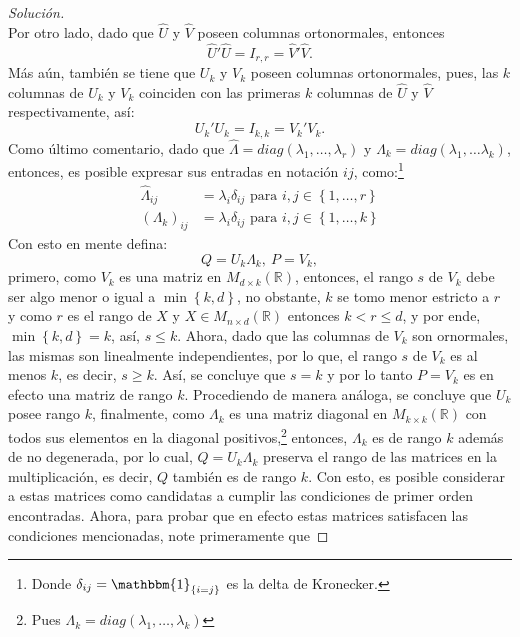 \documentclass[10.5pt,notitlepage]{article}
\newenvironment{solucion}
  {\begin{proof}[Solución]}
  {\end{proof}}
\newcommand{\RR}{\mathbb{R}}
\newcommand{\kis}[1]{\left\{ #1 \right\}}
\theoremstyle{plain}
\begin{document}
\begin{solucion}
\begin{equation}
\end{equation}
Por otro lado, dado que \(\hat{U}\) y \(\hat{V}\) poseen columnas ortonormales, entonces 
\begin{equation}\label{lab.3}
    \hat{U}'\hat{U} = I_{r,r} = \hat{V}'\hat{V}. 
\end{equation}
Más aún, también se tiene que \(U_{k}\) y \(V_{k}\) poseen columnas ortonormales, pues, las \(k\) columnas de \(U_{k}\) y \(V_{k}\) coinciden con las primeras \(k\) columnas de \(\hat{U}\) y \(\hat{V}\) respectivamente, así: 
\begin{equation}\label{lab.4}
    U_{k}'U_{k} = I_{k,k} = V_{k}'V_{k}. 
\end{equation}
Como último comentario, dado que \(\hat{\Lambda} = diag(\lambda_{1}, \hdots, \lambda_{r})\) y \(\Lambda_{k} = diag(\lambda_{1}, \hdots \lambda_{k})\), entonces, es posible expresar sus entradas en notación \(ij\), como:\footnote{Donde \(\delta_{ij} = \mathbbm{1}_{\kis{i = j}}\) es la delta de Kronecker.}
\begin{align}
    \hat{\Lambda}_{ij} &= \lambda_{i}\delta_{ij} \text{ para } i,j \in \kis{1, \hdots, r}\nonumber\\
    (\Lambda_{k})_{ij} &= \lambda_{i}\delta_{ij} \text{ para } i,j \in \kis{1, \hdots, k}\label{lab.0}
\end{align}
Con esto en mente defina:
\begin{equation}
    Q = U_{k}\Lambda_{k}, \ P = V_{k},
\end{equation}
primero, como \(V_{k}\) es una matriz en \(M_{d \times k}(\RR)\), entonces,  el rango \(s\) de \(V_{k}\) debe ser algo menor o igual a \(\min\kis{k,d}\), no obstante, \(k\) se tomo menor estricto a \(r\) y como \(r\) es el rango de \(X\) y \(X \in M_{n \times d}(\RR)\) entonces \(k<r \leq d\), y por ende, \(\min\kis{k,d} = k\), así, \(s \leq k\). Ahora, dado que las columnas de \(V_{k}\) son ornormales, las mismas son linealmente independientes, por lo que, el rango \(s\) de \(V_{k}\) es al menos \(k\), es decir, \(s \geq k\). Así, se concluye que \(s = k\) y por lo tanto \(P = V_{k}\) es en efecto una matriz de rango \(k\). Procediendo de manera análoga, se concluye que \(U_{k}\) posee rango \(k\), finalmente, como \(\Lambda_{k}\) es una matriz diagonal en \(M_{k \times k}(\RR)\) con todos sus elementos en la diagonal positivos,\footnote{Pues \(\Lambda_{k} = diag(\lambda_1, \hdots, \lambda_{k})\)} entonces, \(\Lambda_{k}\) es de rango \(k\) además de no degenerada, por lo cual, \(Q = U_{k}\Lambda_{
k}\) preserva el rango de las matrices en la multiplicación, es decir, \(Q\) también es de rango \(k\). Con esto, es posible considerar a estas matrices como candidatas a cumplir las condiciones de primer orden encontradas. Ahora, para probar que en efecto estas matrices satisfacen las condiciones mencionadas, note primeramente que 

\end{solucion}
\end{document}
